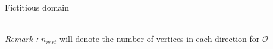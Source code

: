 \begin{frame}{Fictitious domain}
    
    \footnotesize
    \; \\
    \textit{Remark :} $n_{vert}$ will denote the number of vertices in each direction for $\mathcal{O}$
\end{frame}

